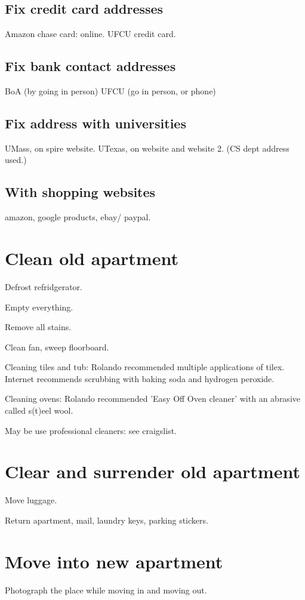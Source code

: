 \documentclass[oneside, article]{memoir}
\begin{document}
\subsection{Fix credit card addresses}
\subitem Amazon chase card: online.
\subitem UFCU credit card.

\subsection{ Fix bank contact addresses}
\subitem BoA (by going in person)
\subitem UFCU (go in person, or phone)

\subsection{Fix address with universities}
\subitem UMass, on spire website.
\subitem UTexas, on website and website 2. (CS dept address used.)

\subsection{With shopping websites}
amazon, google products, ebay/ paypal.

\section{Clean old apartment}
\subitem Defrost refridgerator.

\subitem Empty everything.

\subitem Remove all stains.

\subitem Clean fan, sweep floorboard.

\subitem Cleaning tiles and tub: Rolando recommended multiple applications of tilex. Internet recommends scrubbing with baking soda and hydrogen peroxide.

\subitem Cleaning ovens: Rolando recommended 'Easy Off Oven cleaner' with an abrasive called s(t)eel wool.

\subitem May be use professional cleaners: see craigslist.

\section{Clear and surrender old apartment}
\subitem Move luggage.

\subitem Return apartment, mail, laundry keys, parking stickers.

\section{Move into new apartment}
Photograph the place while moving in and moving out.
\end{document}
